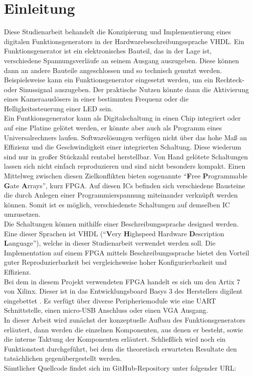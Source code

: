 \chapter[Einleitung]{Einleitung}

Diese Studienarbeit behandelt die Konzipierung und Implementierung eines digitalen Funktionsgenerators in der Hardwarebeschreibungssprache VHDL.
Ein Funktionsgenerator ist ein elektronisches Bauteil, das in der Lage ist, verschiedene Spannungsverläufe an seinem Ausgang auszugeben.
Diese können dann an andere Bauteile angeschlossen und so technisch genutzt werden.
Beispielsweise kann ein Funktionsgenerator eingesetzt werden, um ein Rechteck- oder Sinussignal auszugeben.
Der praktische Nutzen könnte dann die Aktivierung eines Kameraauslösers in einer bestimmten Frequenz oder die Helligkeitssteuerung einer LED sein. \\
Ein Funtkionsgenerator kann als Digitalschaltung in einen Chip integriert oder auf eine Platine gelötet werden, er könnte aber auch als Programm eines Universalrechners laufen.
Softwarelösungen verfügen nicht über das hohe Maß an Effizienz und die Geschwindigkeit einer integrierten Schaltung.
Diese wiederum sind nur in großer Stückzahl rentabel herstellbar.
Von Hand gelötete Schaltungen lassen sich nicht einfach reproduzieren und sind nicht besonders kompakt.
Einen Mittelweg zwischen diesen Zielkonflikten bieten sogenannte ``\textbf{F}ree \textbf{P}rogrammable \textbf{G}ate \textbf{A}rrays'', kurz FPGA.
Auf diesen ICs befinden sich verschiedene Bausteine die durch Anlegen einer Programmierspannung miteinander verknüpft werden können.
Somit ist es möglich, verschiedenste Schaltungen auf demselben IC umzusetzen. \\
Die Schaltungen können mithilfe einer Beschreibungssprache designed werden.
Eine dieser Sprachen ist VHDL (``\textbf{V}ery \textbf{H}ighspeed Hardware \textbf{D}escription \textbf{L}anguage''), welche in dieser Studienarbeit verwendet werden soll.
Die Implementation auf einem FPGA mittels Beschreibungssprache bietet den Vorteil guter Reproduzierbarkeit bei vergleichsweise hoher Konfigurierbarkeit und Effizienz. \\
Bei dem in diesem Projekt verwendeten FPGA handelt es sich um den Artix 7 von Xilinx.
Dieser ist in das Entwicklungsboard Basys 3 des Herstellers digilent eingebettet \cite{digilent2016}.
Es verfügt über diverse Peripheriemodule wie eine UART Schnittstelle, einen micro-USB Anschluss oder einen VGA Ausgang. \\
In dieser Arbeit wird zunächst der konzeptuelle Aufbau des Funktionsgenerators erläutert, dann werden die einzelnen Komponenten, aus denen er besteht, sowie die interne Taktung der Komponenten erläutert.
Schließlich wird noch ein Funktionstest durchgeführt, bei dem die theoretisch erwarteten Resultate den tatsächlichen gegenübergestellt werden. \\
Sämtlicher Quellcode findet sich im GitHub-Repository unter folgender URL: \\
\href{https://github.com/markushart/studienarbeit_function_generator.git}{}